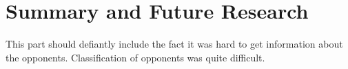 \chapter{Summary and Future Research}\label{ch:summary}

This part should defiantly include the fact it was hard to get information about the opponents.
Classification of opponents was quite difficult.